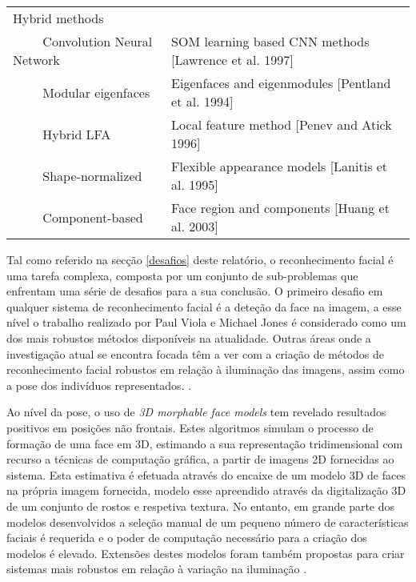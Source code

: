 \begin{center}
\begin{table}
\begin{tabular}{l p{8cm}}
Hybrid methods \\
$\qquad$        Convolution Neural Network & SOM learning based CNN methods [Lawrence et al. 1997] \\ 
$\qquad$        Modular eigenfaces         & Eigenfaces and eigenmodules [Pentland et al. 1994] \\ 
$\qquad$        Hybrid LFA                 & Local feature method [Penev and Atick 1996] \\ 
$\qquad$        Shape-normalized           & Flexible appearance models [Lanitis et al. 1995] \\ 
$\qquad$        Component-based            & Face region and components [Huang et al. 2003] \\
        \hline
    \end{tabular}
	\label{tabelaZhao}
\end{table}
\end{center}
 
 Tal como referido na secção \ref{desafios} deste relatório, o reconhecimento facial é uma tarefa complexa, composta por um conjunto de sub-problemas que enfrentam uma série de desafios para a sua conclusão. O primeiro desafio em qualquer sistema de reconhecimento facial é a deteção da face na imagem, a esse nível o trabalho realizado por Paul Viola e Michael Jones \cite{Viola2004} é considerado como um dos mais robustos métodos disponíveis na atualidade. Outras áreas onde a investigação atual se encontra focada têm a ver com a criação de métodos de reconhecimento facial robustos em relação à iluminação das imagens, assim como a pose dos indivíduos representados. \cite{Chellappa2010}.
 
 Ao nível da pose, o uso de  \textit{3D morphable face models} \cite{Blanz2003} tem revelado resultados positivos em posições não frontais. Estes algoritmos simulam o processo de formação de uma face em 3D, estimando a sua representação tridimensional com recurso a técnicas de computação gráfica, a partir de imagens 2D fornecidas ao sistema. Esta estimativa é efetuada através do encaixe de um modelo 3D de faces na própria imagem fornecida, modelo esse apreendido através da digitalização 3D de um conjunto de rostos e respetiva textura. No entanto, em grande parte dos modelos desenvolvidos a seleção manual de um pequeno número de características faciais é requerida e o poder de computação necessário para a criação dos modelos é elevado. Extensões destes modelos foram também propostas para criar sistemas mais robustos em relação à variação na iluminação \cite{Chellappa2010}.  
 
